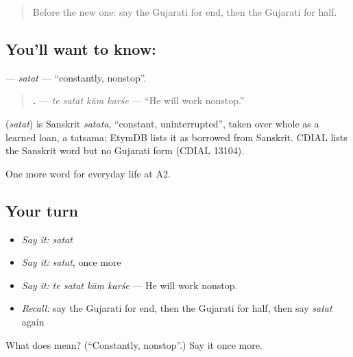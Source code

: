 \label{lesson:GU-C175-satat}



\begin{quote}
Before the new one: say the Gujarati for end, then the Gujarati for half.
\end{quote}

\subsection*{You'll want to know: }
\textbf{} — \emph{satat} — \textquotedblleft{}constantly, nonstop\textquotedblright{}.

\begin{quote}
\textbf{   .} — \emph{te satat kām karśe} — \textquotedblleft{}He will work nonstop.\textquotedblright{}
\end{quote}

\begin{cousinweb}
\textbf{} (\emph{satat}) is Sanskrit \emph{satata}, \textquotedblleft{}constant, uninterrupted\textquotedblright{}, taken over whole as a learned loan, a tatsama; EtymDB lists it as borrowed from Sanskrit. CDIAL lists the Sanskrit word but no Gujarati form (CDIAL 13104).
\end{cousinweb}

\begin{grammarlens}[title={What you've built}]
One more word for everyday life at A2.
\end{grammarlens}

\subsection*{Your turn}
\begin{itemize}
\raggedright
  \item \emph{Say it:} \emph{satat}
  \item \emph{Say it:} \emph{satat}, once more
  \item \emph{Say it:} \emph{te satat kām karśe} — He will work nonstop.
  \item \emph{Recall:} say the Gujarati for end, then the Gujarati for half, then say \emph{satat} again
\end{itemize}

\begin{tcolorbox}[breakable,colback=teal!4,colframe=teal!35!black,title={Before you move on}]
What does  mean? (\textquotedblleft{}Constantly, nonstop\textquotedblright{}.) Say it once more.
\end{tcolorbox}
